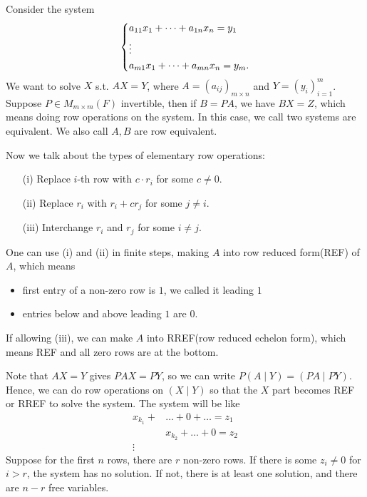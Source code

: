 Consider the system 
\[
    \begin{dcases}
        a_{11} x_1 + \dots + a_{1n} x_n = y_1 \\
        \vdots \\
        a_{m1} x_1 + \dots + a_{mn} x_n = y_m.
    \end{dcases}
\]
We want to solve \(X\) s.t. \(AX = Y\), where \(A = (a_{ij})_{m \times n}\) and \(Y = (y_{i})_{i=1}^m\). Suppose \(P \in M_{m \times m}(F)\) invertible, then if \(B = PA\), we have \(BX=Z\), which means doing row operations on the system. In this case, we call two systems are equivalent. We also call \(A, B\) are row equivalent. 

Now we talk about the types of elementary row operations: 
\begin{itemize}
    \item [(i)] Replace \(i\)-th row with \(c \cdot r_i\) for some \(c \neq 0\). 
    \item [(ii)] Replace \(r_i\) with \(r_i + c r_j\) for some \(j \neq i\). 
    \item [(iii)] Interchange \(r_i\) and \(r_j\) for some \(i \neq j\).       
\end{itemize}

One can use (i) and (ii) in finite steps, making \(A\) into row reduced form(REF) of \(A\), which means   
\begin{itemize}
    \item first entry of a non-zero row is \(1\), we called it leading \(1\)
    \item entries below and above leading \(1\) are \(0\).   
\end{itemize}

If allowing (iii), we can make \(A\) into RREF(row reduced echelon form), which means REF and all zero rows are at the bottom.

Note that \(AX=Y\) gives \(PAX=PY\), so we can write \(P(A \mid Y) = (PA \mid PY)\). Hence, we can do row operations on \((X \mid Y)\) so that the \(X\) part becomes REF or RREF to solve the system. 
The system will be like 
\begin{align*}
    x_{k_1} + &\dots + 0 + \dots = z_1 \\
            &x_{k_2} + \dots + 0 = z_2 \\
    \vdots& 
\end{align*} 
Suppose for the first \(n\) rows, there are \(r\) non-zero rows. If there is some \(z_i \neq 0\) for \(i > r\), the system has no solution. If not, there is at least one solution, and there are \(n - r\) free variables. 

